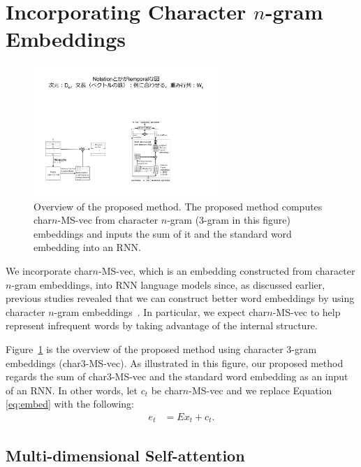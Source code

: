 \documentclass[letterpaper]{article} %
\begin{document}
\section{Incorporating Character \texorpdfstring{$n$}{n}-gram Embeddings}


\begin{figure}[!t]
  \centering
  \includegraphics[width=7cm]{./overview.pdf}
   \caption{Overview of the proposed method. The proposed method computes char$n$-MS-vec from character $n$-gram (3-gram in this figure) embeddings and inputs the sum of it and the standard word embedding into an RNN.}
   \label{fig:overview}
\end{figure}


We incorporate char$n$-MS-vec, which is an embedding constructed from character $n$-gram embeddings, into RNN language models since, as discussed earlier, previous studies revealed that we can construct better word embeddings by using character $n$-gram embeddings~\cite{wieting-EtAl:2016:EMNLP2016,TACL999}.
In particular, we expect char$n$-MS-vec to help represent infrequent words by taking advantage of the internal structure.

Figure~\ref{fig:overview} is the overview of the proposed method using character 3-gram embeddings (char3-MS-vec).
As illustrated in this figure, our proposed method regards the sum of char3-MS-vec and the standard word embedding as an input of an RNN.
In other words, let $c_t$ be char$n$-MS-vec and we replace Equation \ref{eq:embed} with the following:
\begin{align}
  e_t &= E x_t + c_t. \label{eq:embed4proposed}
\end{align}

\subsection{Multi-dimensional Self-attention}
\end{document}

